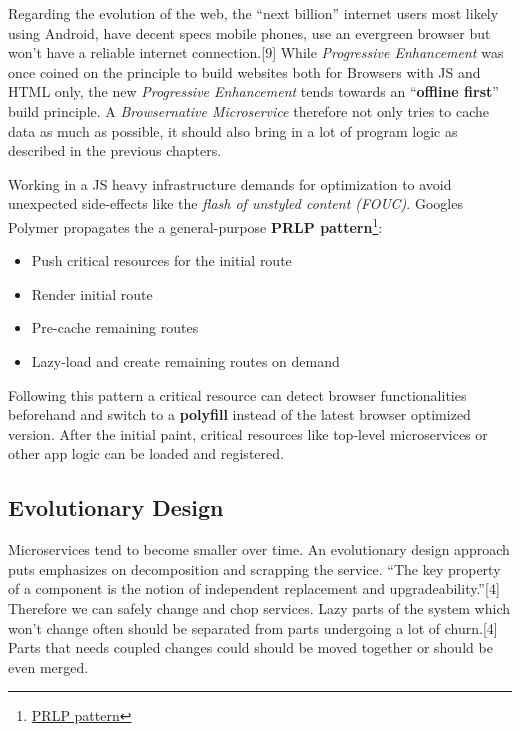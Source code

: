 \documentclass[]{article}
\providecommand{\tightlist}{%
  \setlength{\itemsep}{0pt}\setlength{\parskip}{0pt}}
\begin{document}
Regarding the evolution of the web, the ``next billion'' internet users
most likely using Android, have decent specs mobile phones, use an
evergreen browser but won't have a reliable internet connection.{[}9{]}
While \emph{Progressive Enhancement} was once coined on the principle to
build websites both for Browsers with JS and HTML only, the new
\emph{Progressive Enhancement} tends towards an ``\textbf{offline
first}'' build principle. A \emph{Browsernative Microservice} therefore
not only tries to cache data as much as possible, it should also bring
in a lot of program logic as described in the previous chapters.

Working in a JS heavy infrastructure demands for optimization to avoid
unexpected side-effects like the \emph{flash of unstyled content
(FOUC)}. Googles Polymer propagates the a general-purpose \textbf{PRLP
pattern}\footnote{\href{https://www.polymer-project.org/1.0/toolbox/server}{PRLP
  pattern}}:

\begin{itemize}
\tightlist
\item
  Push critical resources for the initial route
\item
  Render initial route
\item
  Pre-cache remaining routes
\item
  Lazy-load and create remaining routes on demand
\end{itemize}

Following this pattern a critical resource can detect browser
functionalities beforehand and switch to a \textbf{polyfill} instead of
the latest browser optimized version. After the initial paint, critical
resources like top-level microservices or other app logic can be loaded
and registered.

\subsection{Evolutionary Design}\label{evolutionary-design}

Microservices tend to become smaller over time. An evolutionary design
approach puts emphasizes on decomposition and scrapping the service.
``The key property of a component is the notion of independent
replacement and upgradeability.''{[}4{]} Therefore we can safely change
and chop services. Lazy parts of the system which won't change often
should be separated from parts undergoing a lot of churn.{[}4{]} Parts
that needs coupled changes could should be moved together or should be
even merged.
\end{document}
